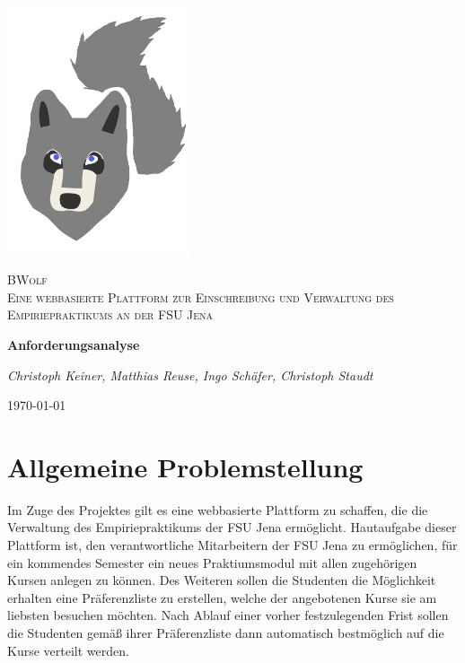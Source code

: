 \documentclass[12pt,a4paper]{article}
\begin{document}
    \onehalfspacing
    
    \begin{titlepage}
        \centering
        \includegraphics[width=0.4\textwidth]{Zweiter_Versuch.png}\par\vspace{1cm}
        {\scshape \LARGE BWolf \\ \Large Eine webbasierte Plattform zur
            Einschreibung und Verwaltung des
            Empiriepraktikums an der FSU Jena\par}
        \vspace{1.5cm}
        {\huge\bfseries Anforderungsanalyse\par}
        \vspace{1.5cm}
        {\large\itshape Christoph Keiner, Matthias Reuse, Ingo Schäfer, Christoph Staudt\par}
        \vspace{1.0cm}
        {\large \today\par}
    \end{titlepage}

    \tableofcontents 
    \clearpage
    
    \section{Allgemeine Problemstellung}
    \label{Problemstellung}
        Im Zuge des Projektes gilt es eine webbasierte Plattform zu schaffen, die die Verwaltung des Empiriepraktikums der FSU Jena ermöglicht.
        Hautaufgabe dieser Plattform ist, den verantwortliche Mitarbeitern der FSU Jena zu ermöglichen, für ein kommendes Semester ein neues Praktiumsmodul mit allen zugehörigen Kursen anlegen zu können.
        Des Weiteren sollen die Studenten die Möglichkeit erhalten eine Präferenzliste zu erstellen, welche der angebotenen Kurse sie am liebsten besuchen möchten.
        Nach Ablauf einer vorher festzulegenden Frist sollen die Studenten gemäß ihrer Präferenzliste dann automatisch bestmöglich auf die Kurse verteilt werden.     
    
\end{document}
